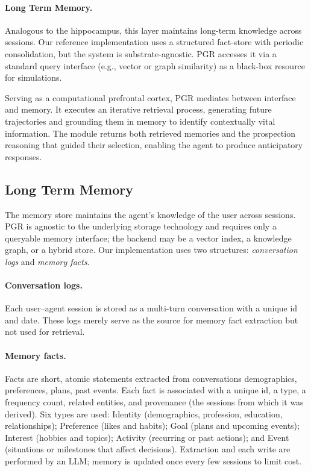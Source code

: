 \vspace{-0.2cm}
\paragraph{Long Term Memory.} 
Analogous to the hippocampus, this layer maintains long-term knowledge across sessions. Our reference implementation uses a structured fact-store with periodic consolidation, but the system is substrate-agnostic. PGR accesses it via a standard query interface (e.g., vector or graph similarity) as a black-box resource for simulations.

Serving as a computational prefrontal cortex, PGR mediates between interface and memory. It executes an iterative retrieval process, generating future trajectories and grounding them in memory to identify contextually vital information. The module returns both retrieved memories and the prospection reasoning that guided their selection, enabling the agent to produce anticipatory responses.

\subsection{Long Term Memory}
\label{sec:pgr-memory}
The memory store maintains the agent's knowledge of the user across sessions. PGR is agnostic to the underlying storage technology and requires only a queryable memory interface; the backend may be a vector index, a knowledge graph, or a hybrid store. Our implementation uses two structures: \emph{conversation logs} and \emph{memory facts}.

\vspace{-0.2cm}
\paragraph{Conversation logs.} Each user--agent session is stored as a multi-turn conversation with a unique id and date. These logs merely serve as the source for memory fact extraction but not used for retrieval.

\vspace{-0.2cm}
\paragraph{Memory facts.} Facts are short, atomic statements extracted from conversations \eg demographics, preferences, plans, past events. Each fact is associated with a unique id, a type, a frequency count, related entities, and provenance (the sessions from which it was derived). Six types are used: Identity (demographics, profession, education, relationships); Preference (likes and habits); Goal (plans and upcoming events); Interest (hobbies and topics); Activity (recurring or past actions); and Event (situations or milestones that affect decisions). Extraction and each write are performed by an LLM; memory is updated once every few sessions to limit cost.

